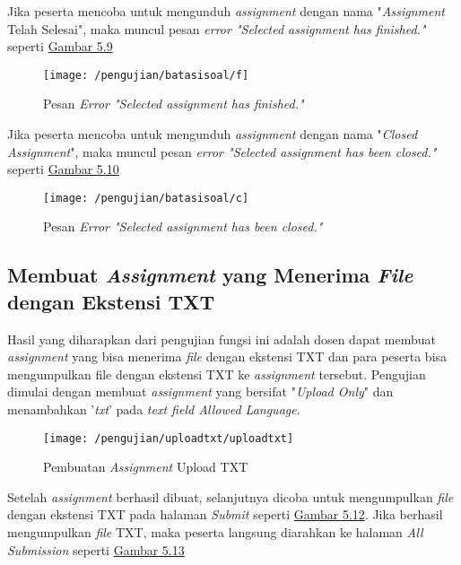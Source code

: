 	Jika peserta mencoba untuk mengunduh \textit{assignment} dengan nama "\textit{Assignment} Telah Selesai", maka muncul pesan \textit{error "Selected assignment has finished."} seperti \hyperref[fig:f]{Gambar 5.9} 
	\begin{figure}[H]
		\centering  
		\texttt{[image: /pengujian/batasisoal/f]}  
		\caption[Pesan\textit{ Error "Selected assignment has finished."}]{Pesan \textit{Error "Selected assignment has finished."}} 
		\label{fig:f} 
	\end{figure}

	Jika peserta mencoba untuk mengunduh \textit{assignment} dengan nama "\textit{Closed Assignment}", maka muncul pesan \textit{error "Selected assignment has been closed."} seperti \hyperref[fig:c]{Gambar 5.10} 
	\begin{figure}[H]
		\centering  
		\texttt{[image: /pengujian/batasisoal/c]}  
		\caption[Pesan \textit{Error "Selected assignment has been closed."}]{Pesan \textit{Error "Selected assignment has been closed."}} 
		\label{fig:c} 
	\end{figure}

	\subsection{Membuat \textit{Assignment} yang Menerima \textit{File} dengan Ekstensi TXT}
	Hasil yang diharapkan dari pengujian fungsi ini adalah dosen dapat membuat \textit{assignment} yang bisa menerima \textit{file} dengan ekstensi TXT dan para peserta bisa mengumpulkan file dengan ekstensi TXT ke \textit{assignment} tersebut. Pengujian dimulai dengan membuat \textit{assignment} yang bersifat "\textit{Upload Only}" dan menambahkan '\textit{txt}' pada \textit{text field Allowed Language}.
	\begin{figure}[H]
		\centering  
		\texttt{[image: /pengujian/uploadtxt/uploadtxt]}  
		\caption[Pembuatan \textit{Assignment} Upload TXT]{Pembuatan \textit{Assignment} Upload TXT} 
		\label{fig:uploadtxt} 
	\end{figure}
	
	Setelah \textit{assignment} berhasil dibuat, selanjutnya dicoba untuk mengumpulkan \textit{file} dengan ekstensi TXT pada halaman \textit{Submit} seperti \hyperref[fig:submittxt]{Gambar 5.12}. Jika berhasil mengumpulkan \textit{file} TXT, maka peserta langsung diarahkan ke halaman \textit{All Submission} seperti \hyperref[fig:resultttxt]{Gambar 5.13}
	
